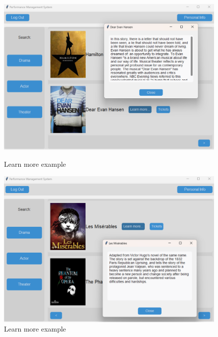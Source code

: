 \documentclass[12pt]{article}
\begin{document}
\begin{figure}[H]
    \centering
    \begin{minipage}{0.48\textwidth}
        \centering
        \includegraphics[width=\textwidth]{11.png}
        \caption{Learn more example} 
        \label{Figure 11}
    \end{minipage}
    \hfill
    \begin{minipage}{0.48\textwidth}
        \centering
        \includegraphics[width=\textwidth]{12.png}
        \caption{Learn more example}
        \label{Figure 12}
    \end{minipage}
\end{figure}
\end{document}
